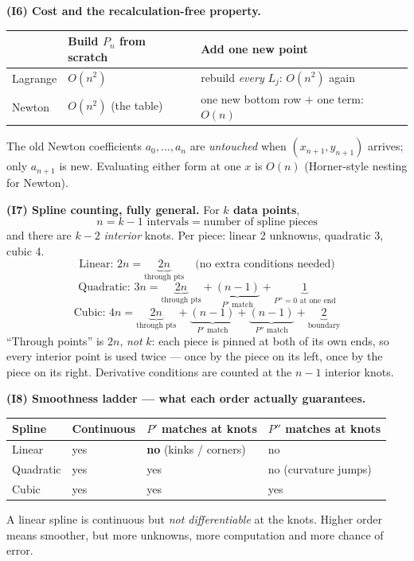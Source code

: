 \begin{derivedbox}
\medskip
\textbf{(I6) Cost and the recalculation-free property.}
\begin{center}\small
\begin{tabular}{@{}lll@{}}
\toprule
 & Build $P_n$ from scratch & Add one new point \\
\midrule
Lagrange & $O(n^2)$ & rebuild \emph{every} $L_j$: $O(n^2)$ again \\
Newton   & $O(n^2)$ (the table) & one new bottom row $+$ one term: $O(n)$ \\
\bottomrule
\end{tabular}
\end{center}
The old Newton coefficients $a_0,\dots,a_n$ are \emph{untouched} when
$(x_{n+1},y_{n+1})$ arrives; only $a_{n+1}$ is new. Evaluating either form at one $x$ is
$O(n)$ (Horner-style nesting for Newton).

\medskip
\textbf{(I7) Spline counting, fully general.} For \textbf{$k$ data points},
\[
  \boxed{\;n=k-1 \text{ intervals} = \text{number of spline pieces}\;}
\]
and there are $k-2$ \emph{interior} knots. Per piece: linear 2 unknowns, quadratic 3,
cubic 4.
\[
  \text{Linear: } 2n=\underbrace{2n}_{\text{through pts}}
  \quad\text{(no extra conditions needed)}
\]
\[
  \text{Quadratic: } 3n=\underbrace{2n}_{\text{through pts}}
  +\underbrace{(n-1)}_{P'\text{ match}}+\underbrace{1}_{P''=0 \text{ at one end}}
\]
\[
  \text{Cubic: } 4n=\underbrace{2n}_{\text{through pts}}
  +\underbrace{(n-1)}_{P'\text{ match}}+\underbrace{(n-1)}_{P''\text{ match}}
  +\underbrace{2}_{\text{boundary}}
\]
``Through points'' is $2n$, \emph{not} $k$: each piece is pinned at both of its own ends,
so every interior point is used twice --- once by the piece on its left, once by the piece
on its right. Derivative conditions are counted at the $n-1$ interior knots.

\medskip
\textbf{(I8) Smoothness ladder --- what each order actually guarantees.}
\begin{center}\small
\begin{tabular}{@{}llll@{}}
\toprule
Spline & Continuous & $P'$ matches at knots & $P''$ matches at knots \\
\midrule
Linear    & yes & \textbf{no} (kinks / corners) & no \\
Quadratic & yes & yes & no (curvature jumps) \\
Cubic     & yes & yes & yes \\
\bottomrule
\end{tabular}
\end{center}
A linear spline is continuous but \emph{not differentiable} at the knots. Higher order
means smoother, but more unknowns, more computation and more chance of error.


\end{derivedbox}
